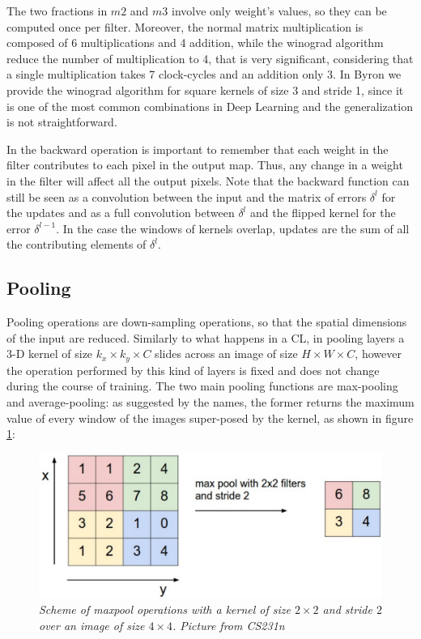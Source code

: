 \documentclass[12pt,a4paper]{report}
\begin{document}
The two fractions in $m2$ and $m3$ involve only weight's values, so they can be computed once per filter. Moreover, the normal matrix multiplication is composed of 6 multiplications and 4 addition, while the winograd algorithm reduce the number of multiplication to 4, that is very significant, considering that a  single multiplication takes 7 clock-cycles and an addition only 3. 
In Byron we provide the winograd algorithm for square kernels of size 3 and stride 1, since it is one of the most common combinations in Deep Learning and the generalization is not straightforward.

In the backward operation is important to remember that each weight in the filter contributes to each pixel in the output map. 
Thus, any change in a weight in the filter will affect all the output pixels. 
Note that the backward function can still be seen as a convolution between the input and the matrix of errors $\delta^l$ for the updates and as a full convolution between $\delta^l$ and the flipped kernel for the error $\delta^{l-1}$.
In the case the windows of kernels overlap, updates are the sum of all the contributing elements of $\delta^l$.

\subsection*{Pooling}

Pooling operations are down-sampling operations, so that the spatial dimensions of the input are reduced. Similarly to what happens in a CL, in pooling layers a 3-D kernel of size $k_x \times k_y \times C$ slides across an image of size $H \times W \times C$, however the operation performed by this kind of layers is fixed and does not change during the course of training.
The two main pooling functions are max-pooling and average-pooling: as suggested by the names, the former  
returns the maximum value of every window of the images super-posed by the kernel, as shown in figure \ref{fig:maxpool}:

\begin{figure}[h]
 \centering
 \includegraphics[scale=0.35]{./images/maxpool.png}
 \caption{\it Scheme of maxpool operations with a kernel of size $2 \times 2$ and stride $2$ over an image of size $4 \times 4$. Picture from CS231n}
 \label{fig:maxpool}
\end{figure}
\end{document}
